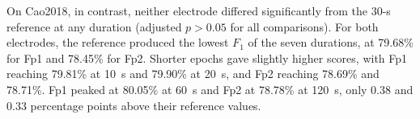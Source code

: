 On Cao2018, in contrast, neither electrode differed significantly from the 30-s reference at any duration (adjusted $p > 0.05$ for all comparisons). For both electrodes, the reference produced the lowest $F_1$ of the seven durations, at 79.68\% for Fp1 and 78.45\% for Fp2. Shorter epochs gave slightly higher scores, with Fp1 reaching 79.81\% at 10~s and 79.90\% at 20~s, and Fp2 reaching 78.69\% and 78.71\%. Fp1 peaked at 80.05\% at 60~s and Fp2 at 78.78\% at 120~s, only 0.38 and 0.33 percentage points above their reference values.